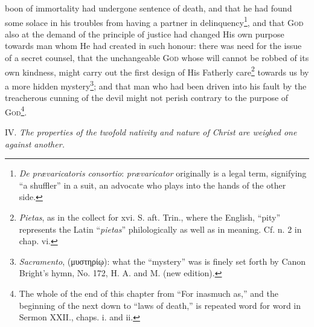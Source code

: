 boon of immortality had undergone sentence of death, and that he had found some solace in his troubles from having a partner in delinquency\footnote{\emph{De prævaricatoris consortio}: \emph{prævaricator} originally is a legal term, signifying “a shuffler” in a suit, an advocate who plays into the hands of the other side.}, and that \textsc{God} also at the demand of the principle of justice had changed His own purpose towards man whom He had created in such honour: there was need for the issue of a secret counsel, that the unchangeable \textsc{God} whose will cannot be robbed of its own kindness, might carry out the first design of His Fatherly care\footnote{\emph{Pietas}, as in the collect for xvi. S. aft. Trin., where the English, “pity” represents the Latin “\emph{pietas}” philologically as well as in meaning. Cf. n. 2 in chap. vi.} towards us by a more hidden mystery\footnote{\emph{Sacramento}, (\textgreek{μυστηρίῳ}): what the “mystery” was is finely set forth by Canon Bright’s hymn, No. 172, H. A. and M. (new edition).}; and that man who had been driven into his fault by the treacherous cunning of the devil might not perish contrary to the purpose of \textsc{God\footnote{The whole of the end of this chapter from “For inasmuch as,” and the beginning of the next down to “laws of death,” is repeated word for word in Sermon XXII., chaps. i. and ii.}}.

IV. \emph{The properties of the twofold nativity and nature of Christ are weighed one against another.}

